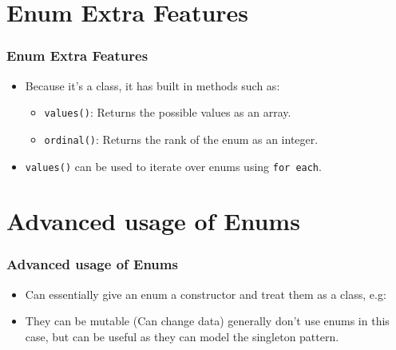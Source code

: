 \documentclass{beamer}
\begin{document}
\section{Enum Extra Features}
\begin{frame}
\frametitle{Enum Extra Features}
\begin{itemize}
\item Because it's a class, it has built in methods such as:
\begin{itemize}
\item \texttt{values()}: Returns the possible values as an array.
\item \texttt{ordinal()}: Returns the rank of the enum as an integer.
\end{itemize}
\item \texttt{values()} can be used to iterate over enums using \texttt{for each}.
\end{itemize}
\end{frame}
\section{Advanced usage of Enums}
\begin{frame}
\frametitle{Advanced usage of Enums}
\begin{itemize}
\item Can essentially give an enum a constructor and treat them as a class, e.g:
\advanced
\item They can be mutable (Can change data) generally don't use enums in this case, but can be useful as they can model the singleton pattern.
\end{itemize}
\end{frame}
\end{document}
